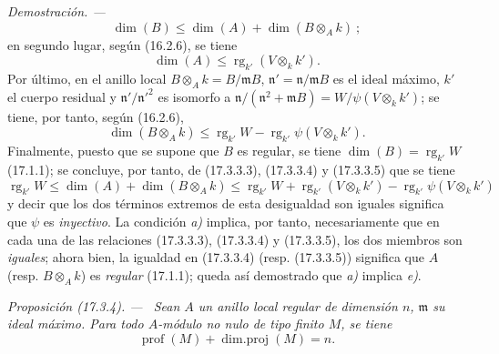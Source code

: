 \documentclass[10pt,oneside]{book}
\makeatletter
\newcommand{\setmanualcurrentlabel}[1]{\def\@currentlabel{#1}}
\newenvironment{proposition}[1][]{%
  \setmanualcurrentlabel{#1}\par\medskip\noindent\itshape Proposición (#1). ---\ }{\par}
\newenvironment{proof}{%
  \par\medskip\noindent\textit{Demostración. ---\ }}{\par}
\providecommand{\setmin}{-}%
\makeatother
\begin{document}
\begin{proof}
\begin{equation}
\label{0.17.3.3.3-es}
\tag{17.3.3.3}
  \dim(B)\leq\dim(A)+\dim(B\otimes_A k)~;
\end{equation}
en segundo lugar, según (16.2.6), se tiene
\begin{equation}
\label{0.17.3.3.4-es}
\tag{17.3.3.4}
  \dim(A)\leq\operatorname{rg}_{k'}(V\otimes_k k').
\end{equation}
Por último, en el anillo local $B\otimes_A k=B/\mathfrak{m}B$,
$\mathfrak{n}'=\mathfrak{n}/\mathfrak{m}B$ es el ideal máximo, $k'$ el cuerpo
residual y $\mathfrak{n}'/\mathfrak{n}'^2$ es isomorfo a
$\mathfrak{n}/(\mathfrak{n}^2+\mathfrak{m}B)
=W/\psi(V\otimes_k k')$; se tiene, por tanto, según (16.2.6),
\begin{equation}
\label{0.17.3.3.5-es}
\tag{17.3.3.5}
  \dim(B\otimes_A k)
  \leq\operatorname{rg}_{k'}W
  \setmin\operatorname{rg}_{k'}\psi(V\otimes_k k').
\end{equation}
Finalmente, puesto que se supone que $B$ es regular, se tiene
$\dim(B)=\operatorname{rg}_{k'}W$ (17.1.1); se concluye, por tanto, de
(17.3.3.3), (17.3.3.4) y (17.3.3.5) que se tiene
\[
  \operatorname{rg}_{k'}W
  \leq\dim(A)+\dim(B\otimes_A k)
  \leq\operatorname{rg}_{k'}W
  +\operatorname{rg}_{k'}(V\otimes_k k')
  \setmin\operatorname{rg}_{k'}\psi(V\otimes_k k')
\]
y decir que los dos términos extremos de esta desigualdad son iguales
significa que $\psi$ es \emph{inyectivo}. La condición \emph{a)} implica, por tanto,
necesariamente que en cada una de las relaciones (17.3.3.3), (17.3.3.4) y
(17.3.3.5), los dos miembros son \emph{iguales}; ahora bien, la igualdad en
(17.3.3.4) (resp. (17.3.3.5)) significa que $A$ (resp. $B\otimes_A k$) es
\emph{regular} (17.1.1); queda así demostrado que \emph{a)} implica \emph{e)}.
\end{proof}

\begin{proposition}[17.3.4]
\label{0.17.3.4-es}
Sean $A$ un anillo local regular de dimensión $n$, $\mathfrak{m}$ su ideal
máximo. Para todo $A$-módulo no nulo de tipo finito $M$, se tiene
\begin{equation}
\label{0.17.3.4.1-es}
\tag{17.3.4.1}
  \operatorname{prof}(M)+\operatorname{dim.proj}(M)=n.
\end{equation}
\end{proposition}
\end{document}
